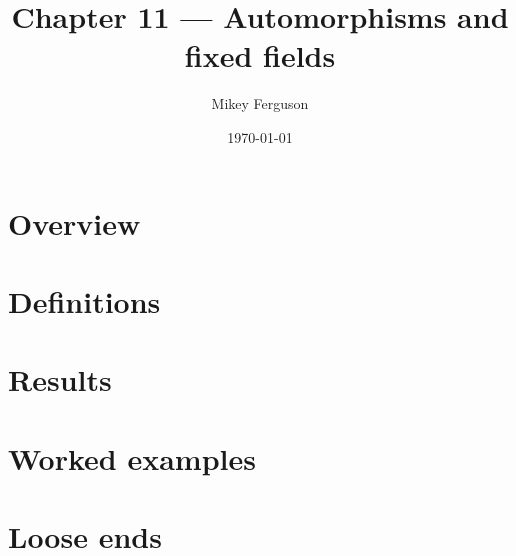 \documentclass[11pt]{article}
\title{Chapter 11 --- Automorphisms and fixed fields}
\author{Mikey Ferguson}
\date{\today}
\begin{document}
\maketitle
\tableofcontents
\bigskip

\section{Overview}

\section{Definitions}

\section{Results}

\section{Worked examples}

\section{Loose ends}
\end{document}
